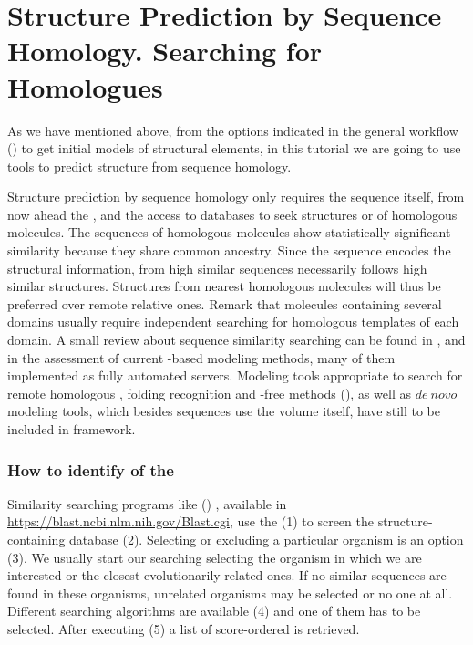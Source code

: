 \section{Structure Prediction by Sequence Homology. Searching for Homologues}
\label{sec:structurePrediction}
As we have mentioned above, from the options indicated in the general workflow () to get initial models of structural elements, in this tutorial we are going to use tools to predict structure from sequence homology. 

Structure prediction by sequence homology only requires the sequence itself, from now ahead the , and the access to databases to seek structures or  of homologous molecules. The sequences of homologous molecules show statistically significant similarity because they share common ancestry. Since the sequence encodes the structural information, from high similar sequences necessarily follows high similar structures. Structures from nearest homologous molecules will thus be preferred over remote relative ones. Remark that molecules containing several domains usually require independent searching for homologous templates of each domain. A small review about sequence similarity searching can be found in \citep{pearson2013}, and in \citep{kryshtafovych2018} the assessment of current -based modeling methods, many of them implemented as fully automated servers. Modeling tools appropriate to search for remote homologous , folding recognition and -free methods (), as well as $de\ novo$ modeling tools, which besides sequences use the volume itself, have still to be included in \scipion framework. 


\subsubsection*{How to identify  of the }
 Similarity searching programs like  () \citep{altschul1997}, available in \url{https://blast.ncbi.nlm.nih.gov/Blast.cgi}, use the  (1) to screen the structure-containing database  (2). Selecting or excluding a particular organism is an option (3). We usually start our searching selecting the organism in which we are interested or the closest evolutionarily related ones. If no similar sequences are found in these organisms, unrelated organisms may be selected or no one at all. Different searching algorithms are available (4) and one of them has to be selected. After executing  (5) a list of score-ordered  is retrieved. 
 
